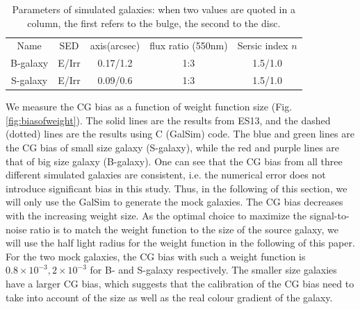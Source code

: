 \documentclass[useAMS,usenatbib]{mn2e}
\begin{document}
%
\begin{center}
\begin{table}
\begin{tabular}{|c|c|c|c|c|}
\hline\hline
Name  &SED  &axis(arcsec) &flux ratio (550nm)  &Sersic index $n$ \\
B-galaxy  &E/Irr &0.17/1.2  &1:3  &1.5/1.0 \\
S-galaxy  &E/Irr &0.09/0.6  &1:3  &1.5/1.0 \\
\hline
\end{tabular}
\caption{\label{table:galaxy model} Parameters of simulated galaxies:
  when two values are quoted in a column, the first refers to the
  bulge, the second to the disc.}
\end{table}
\end{center}
%

We measure the CG bias as a function of weight function size
(Fig.\ref{fig:biasofweight}). The solid lines are the results from
ES13, and the dashed (dotted) lines are the results using C (GalSim)
code. The blue and green lines are the CG bias of small size galaxy
(S-galaxy), while the red and purple lines are that of big size galaxy
(B-galaxy). One can see that the CG bias from all three different
simulated galaxies are consistent, i.e. the numerical error does not
introduce significant bias in this study. Thus, in the following of
this section, we will only use the GalSim to generate the mock
galaxies.
%
The CG bias decreases with the increasing weight size.  As the optimal
choice to maximize the signal-to-noise ratio is to match the weight
function to the size of the source galaxy, we will use the half light
radius for the weight function in the following of this paper. For the
two mock galaxies, the CG bias with such a weight function is
$0.8\times10^{-3}, 2\times10^{-3}$ for B- and S-galaxy respectively.
The smaller size galaxies have a larger CG bias, which suggests that
the calibration of the CG bias need to take into account of the size
as well as the real colour gradient of the galaxy.
\end{document}
